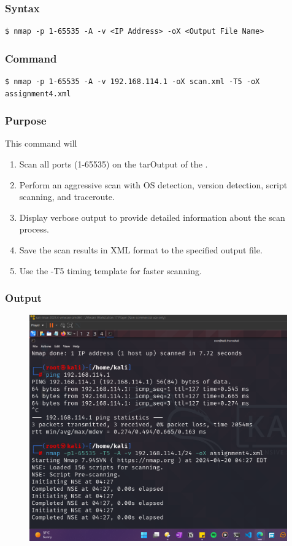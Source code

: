 \documentclass[11pt]{article}
\begin{document}
\subsubsection*{Syntax}
\begin{verbatim}
$ nmap -p 1-65535 -A -v <IP Address> -oX <Output File Name>
\end{verbatim}

\subsubsection*{Command}
\begin{verbatim}
$ nmap -p 1-65535 -A -v 192.168.114.1 -oX scan.xml -T5 -oX assignment4.xml
\end{verbatim}

\subsubsection*{Purpose}
This command will
\begin{enumerate}
    \item Scan all ports (1-65535) on the tarOutput of the .
    \item Perform an aggressive scan with OS detection, version detection, script scanning, and traceroute.
    \item Display verbose output to provide detailed information about the scan process.
    \item Save the scan results in XML format to the specified output file.
    \item Use the -T5 timing template for faster scanning.
\end{enumerate}
\subsubsection*{Output}
\begin{figure}[H]
    \centering
    \includegraphics[width=0.99\textwidth]{a4 (1).png}
\end{figure}
\end{document}
